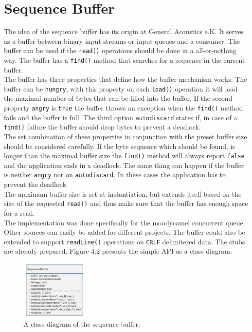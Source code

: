 \section{Sequence Buffer}
The idea of the sequence buffer has its origin at General Acoustics e.K. It serves as a buffer between binary input streams or input queues and a consumer. The buffer can be used if the \texttt{read()} operations should be done in a all-or-nothing way. The buffer has a \texttt{find()} method that searches for a sequence in the current buffer.\\
The buffer has three properties that define how the buffer mechanism works. The buffer can be \texttt{hungry}, with this property on each \texttt{load()} operation it will load the maximal number of bytes that can be filled into the buffer. If the second property \texttt{angry} is \texttt{true} the buffer throws an exception when the \texttt{find()} method fails and the buffer is full. The third option \texttt{autodiscard} states if, in case of a  \texttt{find()} failure the buffer should drop bytes to prevent a deadlock.\\
The set combination of these properties in conjunction with the preset buffer size should be considered carefully. If the byte sequence which should be found, is longer than the maximal buffer size the \texttt{find()} method will always report \texttt{false} and the application ends in a deadlock. The same thing can happen if the buffer is neither \texttt{angry} nor on \texttt{autodiscard}. In these cases the application has to prevent the deadlock.\\
The maximum buffer size is set at instantiation, but extends itself based on the size of the requested \texttt{read()} and thus make sure that the buffer has enough space for a read.\\
The implementation was done specifically for the moodycamel concurrent queue. Other sources can easily be added for different projects. The buffer could also be extended to support \texttt{readLine()} operations on \texttt{CRLF} delimitered data. The stubs are already prepared. Figure 4.2 presents the simple API as a class diagram:
\begin{figure}[ht]
\centering
      \includegraphics[width=0.3\textwidth]{seqbuf}
        \caption{A class diagram of the sequence buffer.}
\end{figure}

